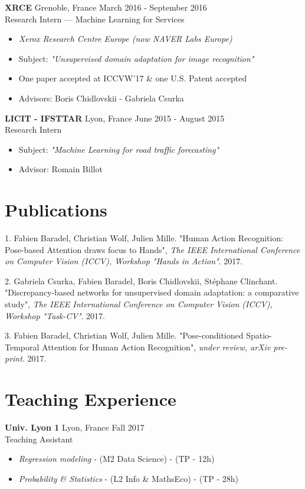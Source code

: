 \documentclass[10pt]{res} %
\begin{document}
\begin{resume}
\textbf{XRCE} \hfill Grenoble, France \hfill March 2016 - September 2016 \\
Research Intern --- Machine Learning for Services
\begin{itemize}
\item \textit{Xerox Research Centre Europe (now NAVER Labs Europe)}
\item Subject: \textit{"Unsupervised domain adaptation for image recognition"}
\item One paper accepted at ICCVW'17 \& one U.S. Patent accepted
\item Advisors: Boris Chidlovskii - Gabriela Csurka
\end{itemize}

\textbf{LICIT - IFSTTAR} \hfill Lyon, France \hfill June 2015 - August 2015 \\
Research Intern
\begin{itemize}
\item Subject: \textit{"Machine Learning for road traffic forecasting"}
\item Advisor: Romain Billot
\end{itemize}



\section{\large Publications} 
1. Fabien Baradel, Christian Wolf, Julien Mille. "Human Action Recognition: Pose-based Attention draws focus to Hands", \textit{The IEEE International Conference on Computer Vision (ICCV), Workshop "Hands in Action"}. 2017.

2. Gabriela Csurka, Fabien Baradel, Boris Chidlovskii, Stéphane Clinchant. "Discrepancy-based networks for unsupervised domain adaptation: a comparative study",  \textit{The IEEE International Conference on Computer Vision (ICCV), Workshop "Task-CV"}. 2017.

3. Fabien Baradel, Christian Wolf, Julien Mille. "Pose-conditioned Spatio-Temporal Attention for Human Action Recognition",  \textit{under review, arXiv pre-print}. 2017.


\section{\large Teaching Experience} 
\textbf{Univ. Lyon 1} \hfill Lyon, France \hfill Fall 2017 \\
Teaching Assistant
\begin{itemize}
	\item \textit{Regression modeling}  - (M2 Data Science) - (TP - 12h)
	\item \textit{Probability \& Statistics}  - (L2 Info \& MathsEco) - (TP - 28h)
\end{itemize}


\end{resume}
\end{document}
